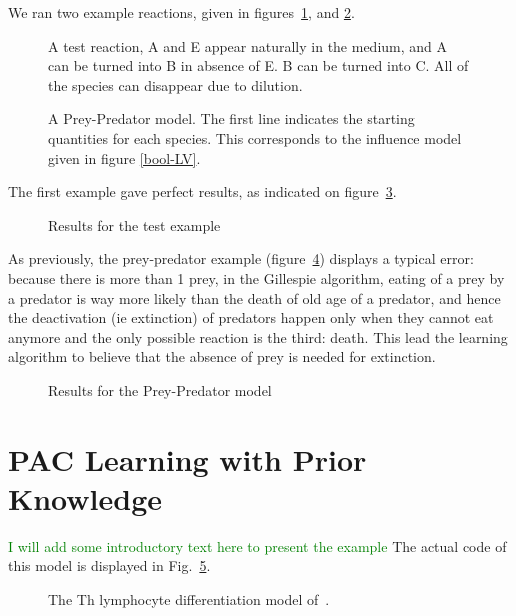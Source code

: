\documentclass{llncs}
\newcommand{\sylvain}[1]{\textcolor{green}{#1}}
\begin{document}


We ran two example reactions, given in figures~\ref{test}, and \ref{preypred}.

\begin{figure}[htbp]
	
	\vspace{-1em}
	\caption{A test reaction, A and E appear naturally in the medium, and A can be turned into B in absence of E. B  can be turned into C. All of the species can disappear due to dilution.\label{test}}
\end{figure}
\begin{figure}[htbp]
	
	\vspace{-1em}
	\caption{A Prey-Predator model. The first line indicates the starting quantities for each species. This corresponds to the influence model given in figure \ref{bool-LV}.\label{preypred}}
\end{figure}

The first example gave perfect results, as indicated on figure~\ref{test_res}.
\begin{figure}
	
	\caption{Results for the test example\label{test_res}}
\end{figure}

As previously, the prey-predator example (figure~\ref{preypred_res}) displays a typical error: because there is more than 1 prey, in the Gillespie algorithm, eating of a prey by a predator is way more likely than the death of old age of a predator, and hence the deactivation (ie extinction) of predators happen only when they cannot eat anymore and the only possible reaction is the third: death. This lead the learning algorithm to believe that the absence of prey is needed for extinction.
\begin{figure}
	
	\caption{Results for the Prey-Predator model\label{preypred_res}}
\end{figure}

\section{PAC Learning with Prior Knowledge}
\begin{example}
   \sylvain{I will add some introductory text here to present the example}
   The actual code of this model is displayed in Fig.~\ref{lympho}.
\begin{figure}[htbp]
	
	\caption{The Th lymphocyte differentiation model of~\cite{RRMTC06tcsb}.\label{lympho}}
\end{figure}
\end{example}
\end{document}
